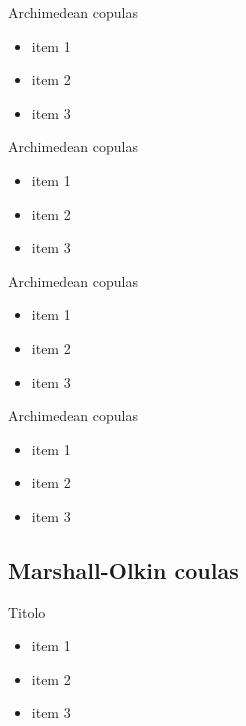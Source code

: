 \documentclass[11pt]{beamer}
\theoremstyle{plain}
\theoremstyle{definition}
\theoremstyle{remark}
\begin{document}
%
\begin{frame}{Archimedean copulas}
   \begin{itemize}
      \item   				  						  
		item 1 
	  \item item 2
\item item 3
   \end{itemize}
\end{frame}
%
\begin{frame}{Archimedean copulas}
   \begin{itemize}
      \item   				  						  
		item 1 
	  \item item 2
\item item 3
   \end{itemize}
\end{frame}
%
\begin{frame}{Archimedean copulas}
   \begin{itemize}
      \item   				  						  
		item 1 
	  \item item 2
\item item 3
   \end{itemize}
\end{frame}
%
\begin{frame}{Archimedean copulas}
   \begin{itemize}
      \item   				  						  
		item 1 
	  \item item 2
\item item 3
   \end{itemize}
\end{frame}
\subsection{Marshall-Olkin coulas}
%
\begin{frame}{Titolo}
   \begin{itemize}
      \item   				  						  
		item 1 
	  \item item 2
\item item 3
   \end{itemize}
\end{frame}
\end{document}
